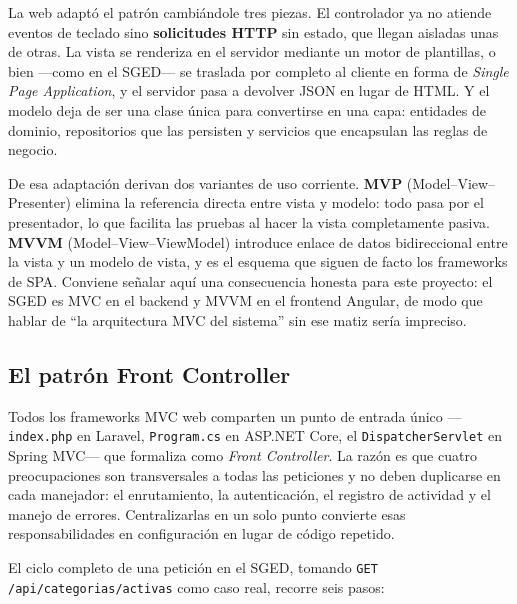 \documentclass[12pt,a4paper]{article}
\begin{document}
La web adaptó el patrón cambiándole tres piezas. El controlador ya no atiende eventos de teclado
sino \textbf{solicitudes HTTP} sin estado, que llegan aisladas unas de otras. La vista se
renderiza en el servidor mediante un motor de plantillas, o bien ---como en el SGED--- se traslada
por completo al cliente en forma de \textit{Single Page Application}, y el servidor pasa a
devolver JSON en lugar de HTML. Y el modelo deja de ser una clase única para convertirse en una
capa: entidades de dominio, repositorios que las persisten y servicios que encapsulan las reglas
de negocio.

De esa adaptación derivan dos variantes de uso corriente. \textbf{MVP}
(Model--View--Presenter) elimina la referencia directa entre vista y modelo: todo pasa por el
presentador, lo que facilita las pruebas al hacer la vista completamente pasiva. \textbf{MVVM}
(Model--View--ViewModel) introduce enlace de datos bidireccional entre la vista y un modelo de
vista, y es el esquema que siguen de facto los frameworks de SPA. Conviene señalar aquí una
consecuencia honesta para este proyecto: el SGED es MVC en el backend y MVVM en el frontend
Angular, de modo que hablar de ``la arquitectura MVC del sistema'' sin ese matiz sería impreciso.

\subsection{El patrón Front Controller}

Todos los frameworks MVC web comparten un punto de entrada único ---\texttt{index.php} en
Laravel, \texttt{Program.cs} en ASP.NET Core, el \texttt{DispatcherServlet} en Spring MVC--- que
\textcite{fowler2002} formaliza como \textit{Front Controller}. La razón es que cuatro
preocupaciones son transversales a todas las peticiones y no deben duplicarse en cada
manejador: el enrutamiento, la autenticación, el registro de actividad y el manejo de errores.
Centralizarlas en un solo punto convierte esas responsabilidades en configuración en lugar de
código repetido.

El ciclo completo de una petición en el SGED, tomando
\texttt{GET /api/categorias/activas} como caso real, recorre seis pasos:
\end{document}

